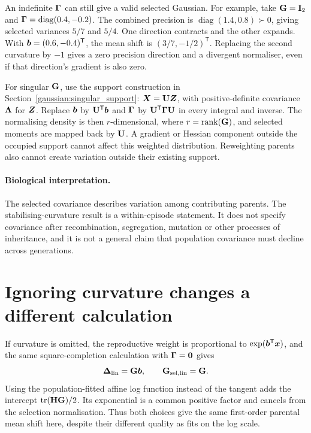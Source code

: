 An indefinite $\boldsymbol{\Gamma}$ can still give a valid selected Gaussian. For
example, take $\mathbf{G}=\mathbf{I}_2$ and
$\boldsymbol{\Gamma}=\operatorname{diag}(0.4,-0.2)$. The combined precision is
$\operatorname{diag}(1.4,0.8)\succ0$, giving selected variances $5/7$
and $5/4$. One direction contracts and the other expands. With
$\boldsymbol{b}=(0.6,-0.4)^{\mathsf T}$, the mean shift is
$(3/7,-1/2)^{\mathsf T}$. Replacing the second curvature by $-1$ gives
a zero precision direction and a divergent normaliser, even if that
direction's gradient is also zero.

For singular $\mathbf{G}$, use the support construction in
Section~\ref{gaussian:singular_support}:
$\boldsymbol{X}=\mathbf{U}\boldsymbol{Z}$, with positive-definite covariance
$\mathbf{\Lambda}$ for $\boldsymbol{Z}$. Replace $\boldsymbol{b}$ by
$\mathbf{U}^{\mathsf T}\boldsymbol{b}$ and $\boldsymbol{\Gamma}$ by
$\mathbf{U}^{\mathsf T}\boldsymbol{\Gamma}\mathbf{U}$ in every integral and inverse.
The normalising density is then $r$-dimensional, where
$r=\operatorname{rank}(\mathbf{G})$, and selected moments are mapped back
by $\mathbf{U}$. A gradient or Hessian component outside the occupied
support cannot affect this weighted distribution. Reweighting parents
also cannot create variation outside their existing support.

\paragraph{Biological interpretation.}
The selected covariance describes variation among contributing parents.
The stabilising-curvature result is a within-episode statement. It does
not specify covariance after recombination, segregation, mutation or
other processes of inheritance, and it is not a general claim that
population covariance must decline across generations.

\section{Ignoring curvature changes a different calculation}
\label{selection:linear_comparison}

If curvature is omitted, the reproductive weight is proportional to
$\exp(\boldsymbol{b}^{\mathsf T}\boldsymbol{x})$, and the same square-completion
calculation with $\boldsymbol{\Gamma}=\mathbf{0}$ gives
\begin{equation}
\boldsymbol{\Delta}_{\mathrm{lin}}=\mathbf{G}\boldsymbol{b},
\qquad \mathbf{G}_{\mathrm{sel,lin}}=\mathbf{G}.
\label{selection:linear_shift}
\end{equation}
Using the population-fitted affine log function instead of the tangent
adds the intercept $\operatorname{tr}(\mathbf{H}\mathbf{G})/2$. Its exponential is a common
positive factor and cancels from the selection normalisation. Thus both
choices give the same first-order parental mean shift here, despite
their different quality as fits on the log scale.

